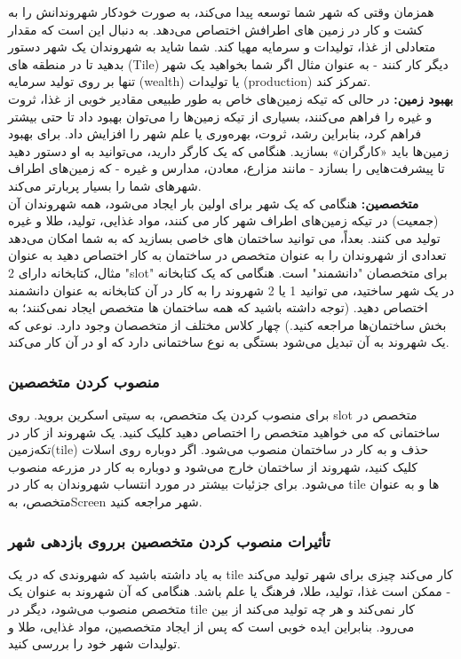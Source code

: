 \documentclass[]{article}
\begin{document}
همزمان وقتی که شهر شما توسعه پیدا می‌­کند، به صورت خودکار شهروندانش را به کشت و کار در زمین های اطرافش اختصاص می­‌دهد. به دنبال این است که مقدار متعادلی از غذا، تولیدات و سرمایه مهیا کند. شما شاید به شهروندان یک شهر دستور بدهید تا در منطقه های (Tile) دیگر کار کنند - به عنوان مثال اگر شما بخواهید یک شهر تنها بر روی تولید سرمایه (wealth) یا تولیدات (production) تمرکز کند. 
\\\noindent \textbf{بهبود زمین:}
در حالی که تیکه­ زمین­‌های خاص به طور طبیعی مقادیر خوبی از غذا، ثروت و غیره را فراهم می‌کنند، بسیاری از تیکه­ زمین‌­ها را می‌توان بهبود داد تا حتی بیشتر فراهم کرد، بنابراین رشد، ثروت، بهره‌وری یا علم شهر را افزایش داد. برای بهبود زمین‌ها باید «کارگران» بسازید. هنگامی که یک کارگر دارید، می‌توانید به او دستور دهید تا پیشرفت‌هایی را بسازد - مانند مزارع، معادن، مدارس و غیره - که زمین‌های اطراف شهرهای شما را بسیار پربارتر می‌کند.
\\\noindent \textbf{متخصصین:}
هنگامی که یک شهر برای اولین بار ایجاد می‌شود، همه شهروندان آن (جمعیت) در تیکه ­زمین­‌های اطراف شهر کار می کنند، مواد غذایی، تولید، طلا و غیره تولید می کنند. بعداً، می توانید ساختمان های خاصی بسازید که به شما امکان می‌دهد تعدادی از شهروندان را به عنوان متخصص در ساختمان به کار اختصاص دهید به عنوان مثال، کتابخانه دارای 2 "slot" برای متخصصان "دانشمند" است. هنگامی که یک کتابخانه در یک شهر ساختید، می توانید 1 یا 2 شهروند را به کار در آن کتابخانه به عنوان دانشمند اختصاص دهید. (توجه داشته باشید که همه ساختمان ها متخصص ایجاد نمی‌کنند؛ به بخش ساختمان‌ها مراجعه کنید.) چهار کلاس مختلف از متخصصان وجود دارد. نوعی که یک شهروند به آن تبدیل می‌شود بستگی به نوع ساختمانی دارد که او در آن کار می‌کند.

\subsubsection*{{\titr منصوب کردن متخصصین}}
برای منصوب کردن یک متخصص، به سیتی اسکرین بروید. روی slot متخصص در ساختمانی که می خواهید متخصص را اختصاص دهید کلیک کنید. یک شهروند از کار در تکه‌زمین­(tile) حذف و به کار در ساختمان منصوب می‌شود. اگر دوباره روی اسلات کلیک کنید، شهروند از ساختمان خارج می‌شود و دوباره به کار در مزرعه منصوب می‌شود. برای جزئیات بیشتر در مورد انتساب شهروندان به کار در tile ها و به عنوان متخصص، به‌Screen شهر مراجعه کنید.

\subsubsection*{{\titr تأثیرات منصوب کردن متخصصین بر­روی بازدهی شهر}}
به یاد داشته باشید که شهروندی که در یک tile کار می‌کند چیزی برای شهر تولید می‌کند - ممکن است غذا، تولید، طلا، فرهنگ یا علم باشد. هنگامی که آن شهروند به عنوان یک متخصص منصوب می‌شود، دیگر در tile کار نمی‌کند و هر چه تولید می‌کند از بین می‌رود. بنابراین ایده خوبی است که پس از ایجاد متخصصین، مواد غذایی، طلا و تولیدات شهر خود را بررسی کنید.
\end{document}
